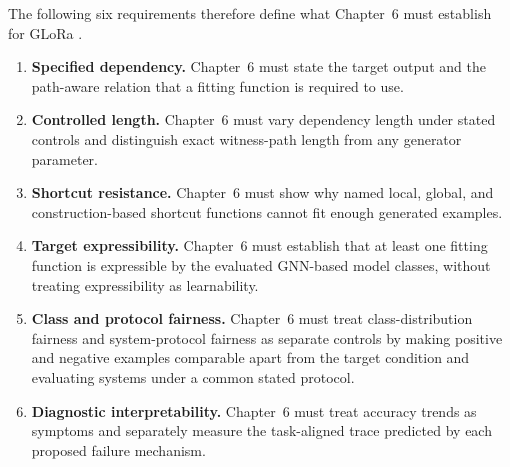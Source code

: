 The following six requirements therefore define what Chapter~6 must establish for GLoRa \cite{zhou2025glora}.
\begin{enumerate}
\item \textbf{Specified dependency.} Chapter~6 must state the target output and the path-aware relation that a fitting function is required to use.
\item \textbf{Controlled length.} Chapter~6 must vary dependency length under stated controls and distinguish exact witness-path length from any generator parameter.
\item \textbf{Shortcut resistance.} Chapter~6 must show why named local, global, and construction-based shortcut functions cannot fit enough generated examples.
\item \textbf{Target expressibility.} Chapter~6 must establish that at least one fitting function is expressible by the evaluated GNN-based model classes, without treating expressibility as learnability.
\item \textbf{Class and protocol fairness.} Chapter~6 must treat class-distribution fairness and system-protocol fairness as separate controls by making positive and negative examples comparable apart from the target condition and evaluating systems under a common stated protocol.
\item \textbf{Diagnostic interpretability.} Chapter~6 must treat accuracy trends as symptoms and separately measure the task-aligned trace predicted by each proposed failure mechanism.
\end{enumerate}

